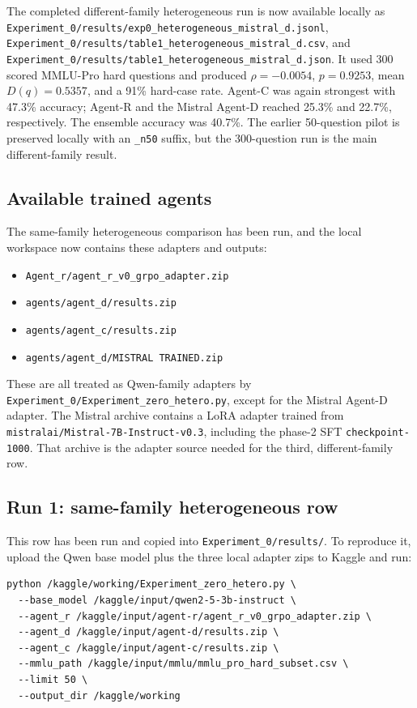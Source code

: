 \documentclass{article}
\begin{document}
The completed different-family heterogeneous run is now available locally as
\texttt{Experiment\_0/results/exp0\_heterogeneous\_mistral\_d.jsonl},
\texttt{Experiment\_0/results/table1\_heterogeneous\_mistral\_d.csv}, and
\texttt{Experiment\_0/results/table1\_heterogeneous\_mistral\_d.json}. It used
300 scored MMLU-Pro hard questions and produced \(\rho=-0.0054\),
\(p=0.9253\), mean \(D(q)=0.5357\), and a 91\% hard-case rate. Agent-C was
again strongest with 47.3\% accuracy; Agent-R and the Mistral Agent-D reached
25.3\% and 22.7\%, respectively. The ensemble accuracy was 40.7\%. The
earlier 50-question pilot is preserved locally with an \texttt{\_n50} suffix,
but the 300-question run is the main different-family result.

\subsection{Available trained agents}

The same-family heterogeneous comparison has been run, and the local
workspace now contains these adapters and outputs:

\begin{itemize}
\item \texttt{Agent\_r/agent\_r\_v0\_grpo\_adapter.zip}
\item \texttt{agents/agent\_d/results.zip}
\item \texttt{agents/agent\_c/results.zip}
\item \texttt{agents/agent\_d/MISTRAL TRAINED.zip}
\end{itemize}

These are all treated as Qwen-family adapters by
\texttt{Experiment\_0/Experiment\_zero\_hetero.py}, except for the Mistral
Agent-D adapter. The Mistral archive contains a LoRA adapter trained from
\texttt{mistralai/Mistral-7B-Instruct-v0.3}, including the phase-2 SFT
\texttt{checkpoint-1000}. That archive is the adapter source needed for the
third, different-family row.

\subsection{Run 1: same-family heterogeneous row}

This row has been run and copied into \texttt{Experiment\_0/results/}. To
reproduce it, upload the Qwen base model plus the three local adapter zips to
Kaggle and run:

\begin{verbatim}
python /kaggle/working/Experiment_zero_hetero.py \
  --base_model /kaggle/input/qwen2-5-3b-instruct \
  --agent_r /kaggle/input/agent-r/agent_r_v0_grpo_adapter.zip \
  --agent_d /kaggle/input/agent-d/results.zip \
  --agent_c /kaggle/input/agent-c/results.zip \
  --mmlu_path /kaggle/input/mmlu/mmlu_pro_hard_subset.csv \
  --limit 50 \
  --output_dir /kaggle/working
\end{verbatim}
\end{document}
